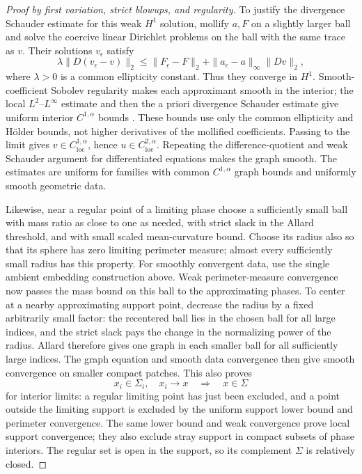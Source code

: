 \begin{proof}[Proof by first variation, strict blowups, and regularity]
To justify the divergence Schauder estimate for this weak $H^1$
solution, mollify $a,F$ on a slightly larger ball and solve the
coercive linear Dirichlet problems on the ball with the same trace as
$v$.  Their solutions $v_\epsilon$ satisfy
\[
 \lambda\|D(v_\epsilon-v)\|_2
 \le \|F_\epsilon-F\|_2
       +\|a_\epsilon-a\|_\infty\|Dv\|_2,
\]
where $\lambda>0$ is a common ellipticity constant.  Thus they converge
in $H^1$.  Smooth-coefficient Sobolev regularity makes each approximant
smooth in the interior; the local $L^2$--$L^\infty$ estimate and then
the a priori divergence Schauder estimate give uniform interior
$C^{1,\alpha}$ bounds
\citep[Lecture~6, Theorem~1 and Corollary~1; Lecture~18, Theorem~2;
Lecture~12, Theorem~1]{simonPDE}.
These bounds use only the common ellipticity and H\"older bounds,
not higher derivatives of the mollified coefficients.  Passing to
the limit gives $v\in C^{1,\alpha}_{\mathrm{loc}}$, hence
$u\in C^{2,\alpha}_{\mathrm{loc}}$.  Repeating the difference-quotient
and weak Schauder argument for differentiated equations makes the
graph smooth.  The estimates are uniform for families with common
$C^{1,\alpha}$ graph bounds and uniformly smooth geometric data.

Likewise, near a regular point of a limiting phase choose a sufficiently
small ball with mass ratio as close to one as needed, with strict slack
in the Allard threshold, and with small scaled mean-curvature bound.
Choose its radius also so that its sphere has zero limiting perimeter
measure; almost every sufficiently small radius has this property.
For smoothly convergent data, use the single ambient embedding
construction above.  Weak perimeter-measure convergence now passes the
mass bound on this ball to the approximating phases.  To center at a
nearby approximating support point, decrease the radius by a fixed
arbitrarily small factor: the recentered ball lies in the chosen ball
for all large indices, and the strict slack pays the change in the
normalizing power of the radius.  Allard therefore gives one graph in
each smaller ball for all sufficiently large indices.  The graph equation and smooth data convergence then give
smooth convergence on smaller compact patches.  This also proves
\[
 x_i\in\Sigma_i,\quad x_i\longrightarrow x
                    \quad\Longrightarrow\quad x\in\Sigma
\]
for interior limits: a regular limiting point has just been excluded,
and a point outside the limiting support is excluded by the uniform
support lower bound and perimeter convergence.  The same lower bound
and weak convergence prove local support convergence; they also exclude
stray support in compact subsets of phase interiors.  The regular set
is open in the support, so its complement $\Sigma$ is relatively closed.


\end{proof}
